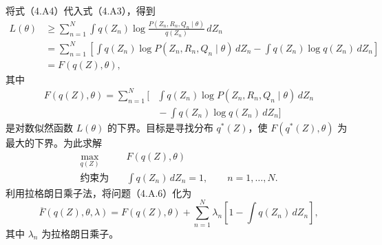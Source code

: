 将式（4.A4）代入式（4.A3），得到
\[
\begin{aligned}
L(\theta)&\ge\sum_{n=1}^{N}\int q(Z_n)
 \log\frac{P(Z_n,R_n,Q_n\mid\theta)}{q(Z_n)}\,dZ_n\\
&=\sum_{n=1}^{N}\left[
 \int q(Z_n)\log P(Z_n,R_n,Q_n\mid\theta)\,dZ_n
 -\int q(Z_n)\log q(Z_n)\,dZ_n\right]\\
&=F(q(Z),\theta),
\end{aligned}
\]
其中
\begin{equation}
\begin{aligned}
F(q(Z),\theta)=\sum_{n=1}^{N}\biggl[
 &\int q(Z_n)\log P(Z_n,R_n,Q_n\mid\theta)\,dZ_n\\
 &{}-\int q(Z_n)\log q(Z_n)\,dZ_n\biggr]
\end{aligned}\tag{4.A.5}
\end{equation}
是对数似然函数 $L(\theta)$ 的下界。目标是寻找分布 $q^*(Z)$，使 $F(q^*(Z),\theta)$ 为最大的下界。为此求解
\begin{equation}
\begin{aligned}
\max_{q(Z)}\quad&F(q(Z),\theta)\\
\text{约束为}\quad&\int q(Z_n)\,dZ_n=1,\qquad n=1,\ldots,N.
\end{aligned}\tag{4.A.6}
\end{equation}
利用拉格朗日乘子法，将问题（4.A.6）化为
\begin{equation}
\overline F(q(Z),\theta,\lambda)=F(q(Z),\theta)
+\sum_{n=1}^{N}\lambda_n\left[1-\int q(Z_n)\,dZ_n\right],\tag{4.A.7}
\end{equation}
其中 $\lambda_n$ 为拉格朗日乘子。

